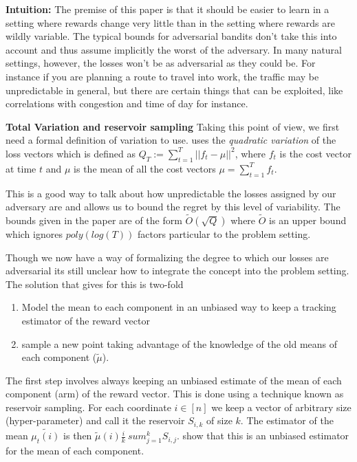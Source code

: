 \textbf{Intuition:}
The premise of this paper is that it should be easier to learn in a setting where
rewards change very little than in the setting where rewards are wildly variable. 
The typical bounds for adversarial bandits don't take this into account and thus assume implicitly the 
worst of the adversary. In many natural settings, however, the losses won't be as adversarial as they could be. For
instance if you are planning a route to travel into work, the traffic may be unpredictable in general, but there 
are certain things that can be exploited, like correlations with congestion and time of day for instance.

\textbf{Total Variation and reservoir sampling}
Taking this point of view, we first need a formal definition of variation to use.  \citep{hazan} uses the
\textit{quadratic variation} of the loss vectors which is defined as $Q_T := \sum_{t=1}^T || f_t - \mu ||^2$,
where $f_t$ is the cost vector at time $t$ and $\mu$ is the mean of all the cost vectors
$\mu = \sum_{t=1}^T f_t$. 

This is a good  way to talk about how unpredictable the losses assigned by our adversary are and allows us to bound the
regret by this level of variability. The bounds given in the paper are of the form
$\tilde{O}(\sqrt{Q})$ where $\tilde{O}$ is an upper bound which ignores $poly(log(T))$ factors
particular to the problem setting. 

Though we now have a way of formalizing the degree to which our losses are adversarial its still unclear
how to integrate the concept into the problem setting. The solution that \citep{hazan} gives for this is two-fold

\begin{enumerate}
\item
  Model the mean to each component in an unbiased way to keep a tracking estimator of the reward vector 
\item
  sample a new point taking advantage of the knowledge of the old means of each component ($\tilde{\mu}$).
\end{enumerate}

The first step involves always keeping an unbiased estimate of the mean of each component (arm) of 
the reward vector. This is done using a technique known as reservoir sampling.
For each coordinate $i\in[n]$ we keep a vector of arbitrary size (hyper-parameter) and call it the reservoir $S_{i, k}$ of size $k$.
The estimator of the mean $\tilde{\mu_t(i)}$ is then  $\tilde{\mu}(i) \frac{i}{k} \ sum_{j=1}^kS_{i, j}$. 
\citep{hazan} show that this is an unbiased estimator for the mean of each component.\\


